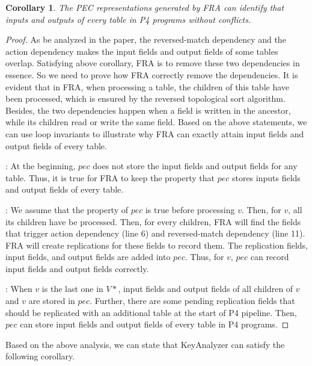 \documentclass[sigconf, 10pt]{acmart}
\theoremstyle{plain}
\newtheorem{cor}{Corollary}
\begin{document}
\begin{cor}

    The PEC representations generated by FRA can identify that inputs and outputs of every table in P4 programs without conflicts.

\end{cor}
    
    
\begin{proof}
    As be analyzed in the paper, the reversed-match dependency and the action dependency makes the input fields and output fields of some tables overlap. 
    Satisfying above corollary, FRA is to remove these two dependencies in essence. So we need to prove how FRA correctly remove the dependencies.
    It is evident that in FRA, when processing a table, the children of this table have been processed, which is ensured by the reversed topological sort algorithm. Besides, the two dependencies happen when a field is written in the ancestor, 
    while its children read or write the same field. Based on the above statements, 
    we can use loop invariants to illustrate why FRA can exactly attain input fields and output fields of every table.
    
    : At the beginning, $pec$ does not store the input fields and output fields for any table. 
    Thus, it is true for FRA to keep the property that $pec$ stores inputs fields and output fields of every table. 
    
    : We assume that the property of $pec$ is true before processing $v$. Then, for $v$, all its children have be processed. 
    Then, for every children, FRA will find the fields that trigger action dependency (line 6) and reversed-match dependency (line 11). FRA will create replications for these fields to record them. 
    The replication fields, input fields, and output fields are added into $pec$. Thus, for $v$, $pec$ can record input fields and output fields correctly. 
    
    : When $v$ is the last one in $V*$, input fields and output fields of all children of $v$ and $v$ are stored in $pec$. 
    Further, there are some pending replication fields that should be replicated with an additional table at the start of P4 pipeline. 
    Then, $pec$ can store input fields and output fields of every table in P4 programs.
\end{proof}
    


Based on the above analysis, we can state that KeyAnalyzer can satisfy the following corollary.
\end{document}
